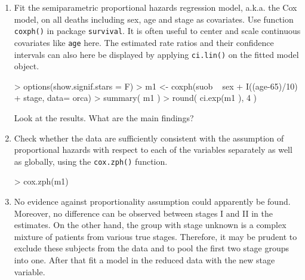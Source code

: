 \begin{enumerate}

\item
Fit the semiparametric proportional hazards
 regression model, a.k.a. the Cox model, on all deaths including
 sex, age and stage as covariates. Use function
 {\tt coxph()} in package \texttt{survival}.
 It is often useful to center and scale
continuous covariates like \texttt{age} here.
The estimated rate ratios and their confidence intervals
can also here be displayed  by applying {\tt ci.lin()}
on the fitted model object.
\begin{Schunk}
\begin{Sinput}
> options(show.signif.stars = F)
> m1 <- coxph(suob ~ sex + I((age-65)/10) + stage, data= orca)
> summary( m1 )
> round( ci.exp(m1 ), 4 )
\end{Sinput}
\end{Schunk}

Look at the results. What are the main findings?


\item Check whether the data are sufficiently consistent with the
assumption of proportional hazards with respect to each of
the variables separately
as well as globally, using the \texttt{cox.zph()} function.
\begin{Schunk}
\begin{Sinput}
> cox.zph(m1)
\end{Sinput}
\end{Schunk}


\item
No evidence against proportionality assumption could apparently be found.
Moreover, no difference can be observed between stages I and II in the estimates.
 On the other hand, the
group with stage unknown is a complex mixture of patients from various
true stages. Therefore, it may be prudent to exclude these subjects from the data
and to pool the first two stage groups into one. After that fit a model in
the reduced data with the new stage variable.
\begin{Schunk}
\end{Schunk}


\end{enumerate}
